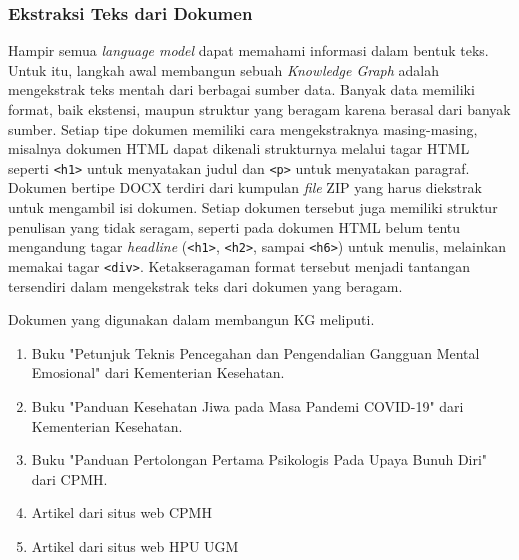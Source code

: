 \subsubsection{Ekstraksi Teks dari Dokumen}
Hampir semua \textit{language model} dapat memahami informasi dalam bentuk teks.
Untuk itu, langkah awal membangun sebuah \textit{Knowledge Graph} adalah mengekstrak teks mentah dari berbagai sumber data.
Banyak data memiliki format, baik ekstensi, maupun struktur yang beragam karena berasal dari banyak sumber.
Setiap tipe dokumen memiliki cara mengekstraknya masing-masing, misalnya dokumen HTML dapat dikenali strukturnya melalui tagar HTML seperti \texttt{<h1>} untuk menyatakan judul dan \texttt{<p>} untuk menyatakan paragraf.
Dokumen bertipe DOCX terdiri dari kumpulan \textit{file} ZIP yang harus diekstrak untuk mengambil isi dokumen.
Setiap dokumen tersebut juga memiliki struktur penulisan yang tidak seragam, seperti pada dokumen HTML belum tentu mengandung tagar \textit{headline} (\texttt{<h1>}, \texttt{<h2>}, sampai \texttt{<h6>}) untuk menulis, melainkan memakai tagar \texttt{<div>}.
Ketakseragaman format tersebut menjadi tantangan tersendiri dalam mengekstrak teks dari dokumen yang beragam.

Dokumen yang digunakan dalam membangun KG meliputi.
\begin{enumerate}
	\item Buku "Petunjuk Teknis Pencegahan dan Pengendalian Gangguan Mental Emosional" dari Kementerian Kesehatan.
	\item Buku "Panduan Kesehatan Jiwa pada Masa Pandemi COVID-19" dari Kementerian Kesehatan.
	\item Buku "Panduan Pertolongan Pertama Psikologis Pada Upaya Bunuh Diri" dari CPMH.
	\item Artikel dari situs web CPMH
	\item Artikel dari situs web HPU UGM
\end{enumerate}


